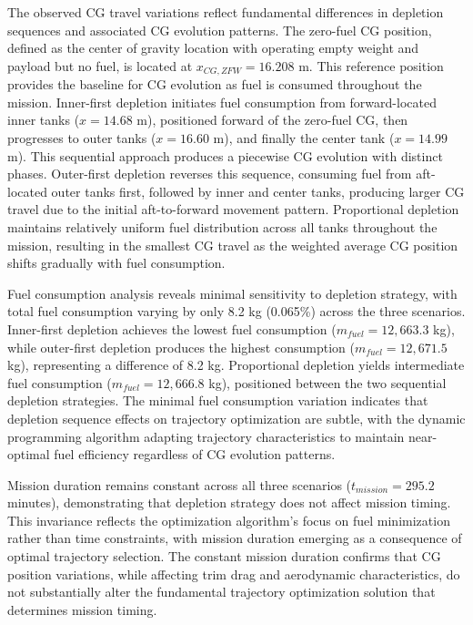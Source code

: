 The observed CG travel variations reflect fundamental differences in depletion sequences and associated CG evolution patterns. The zero-fuel CG position, defined as the center of gravity location with operating empty weight and payload but no fuel, is located at $x_{CG,ZFW} = 16.208$ m. This reference position provides the baseline for CG evolution as fuel is consumed throughout the mission. Inner-first depletion initiates fuel consumption from forward-located inner tanks ($x = 14.68$ m), positioned forward of the zero-fuel CG, then progresses to outer tanks ($x = 16.60$ m), and finally the center tank ($x = 14.99$ m). This sequential approach produces a piecewise CG evolution with distinct phases. Outer-first depletion reverses this sequence, consuming fuel from aft-located outer tanks first, followed by inner and center tanks, producing larger CG travel due to the initial aft-to-forward movement pattern. Proportional depletion maintains relatively uniform fuel distribution across all tanks throughout the mission, resulting in the smallest CG travel as the weighted average CG position shifts gradually with fuel consumption.


Fuel consumption analysis reveals minimal sensitivity to depletion strategy, with total fuel consumption varying by only 8.2 kg (0.065\%) across the three scenarios. Inner-first depletion achieves the lowest fuel consumption ($m_{fuel} = 12,663.3$ kg), while outer-first depletion produces the highest consumption ($m_{fuel} = 12,671.5$ kg), representing a difference of 8.2 kg. Proportional depletion yields intermediate fuel consumption ($m_{fuel} = 12,666.8$ kg), positioned between the two sequential depletion strategies. The minimal fuel consumption variation indicates that depletion sequence effects on trajectory optimization are subtle, with the dynamic programming algorithm adapting trajectory characteristics to maintain near-optimal fuel efficiency regardless of CG evolution patterns.

Mission duration remains constant across all three scenarios ($t_{mission} = 295.2$ minutes), demonstrating that depletion strategy does not affect mission timing. This invariance reflects the optimization algorithm's focus on fuel minimization rather than time constraints, with mission duration emerging as a consequence of optimal trajectory selection. The constant mission duration confirms that CG position variations, while affecting trim drag and aerodynamic characteristics, do not substantially alter the fundamental trajectory optimization solution that determines mission timing.

